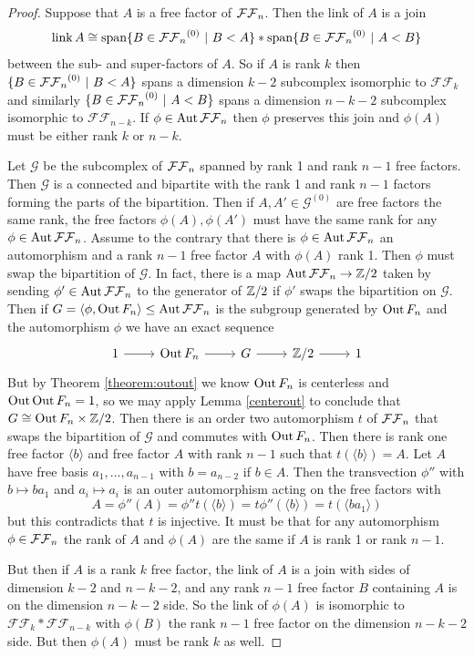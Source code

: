 \begin{proof}
  Suppose that $A$ is a free factor of ${ \mathcal {FF}_n }$.
  Then the link of $A$ is a join
  $$
  \operatorname{link} A \cong  \mbox{span} \{B \in {\ensuremath{ \mathcal {FF}_n }}^{(0)} \ | \ B < A\} \ast \mbox{span} \{B \in {\ensuremath{ \mathcal {FF}_n }}^{(0)}  \ | \ A<B\}
  $$
  between the sub- and  super-factors of $A$.
  So if $A$ is rank $k$ then
  $\{B \in {\ensuremath{ \mathcal {FF}_n }}^{(0)} \ | \ B < A\}$ spans a dimension $k-2$ subcomplex
  isomorphic to $\mathcal{FF}_k$ and similarly $\{B \in \ffn^{(0)}  \ | \ A<B\}$
  spans a dimension $n-k-2$ subcomplex
  isomorphic to $\mathcal{FF}_{n-k}$.
  If $\phi \in \operatorname{Aut} { \mathcal {FF}_n }$ then $\phi$ preserves this join and $\phi(A)$ must be either rank $k$ or $n-k$.

  Let $\mathcal G$ be the subcomplex of ${ \mathcal {FF}_n }$ spanned by rank 1 and rank $n-1$ free factors.
  Then $\mathcal G$ is a connected and bipartite with the rank 1 and rank $n-1$ factors forming the parts of the bipartition.
  Then if $A,A' \in \mathcal G^{(0)}$ are free factors the same rank, the free factors $\phi(A),\phi(A')$ must have the same rank for any $\phi \in \operatorname{Aut} { \mathcal {FF}_n }$.
  Assume to the contrary that there is $\phi \in \operatorname{Aut} { \mathcal {FF}_n }$ an automorphism
  and a rank $n-1$ free factor $A$ with $\phi(A)$ rank 1.
  Then $\phi$ must swap the bipartition of $\mathcal G$.
  In fact, there is a map $\operatorname{Aut} { \mathcal {FF}_n } \to \mathbb{Z}/2$ taken by sending $\phi' \in \operatorname{Aut} { \mathcal {FF}_n }$ to the generator of $\mathbb{Z}/2$
  if $\phi'$ swaps the bipartition on $\mathcal G$.
  Then if $G = \langle \phi, \operatorname{Out} F_n \rangle  \leq \operatorname{Aut} { \mathcal {FF}_n }$ is the subgroup generated by $\operatorname{Out} F_n$ and the automorphism $\phi$
  we have an exact sequence
  $$
  \begin{tikzcd}
    1 \arrow{r} &
    \oout F_n \arrow{r} &
    G  \arrow{r}&
    \Z/2  \arrow{r}&
    1
  \end{tikzcd}
  $$
  But by Theorem \ref{theorem:outout} we know $\operatorname{Out} F_n$ is centerless and $\operatorname{Out} \operatorname{Out} F_n = 1$,
  so we may apply Lemma
  \ref{centerout}
  to conclude that $G \cong \operatorname{Out} F_n  \times \mathbb{Z}/2$.
  Then there is an order two automorphism $t$ of ${ \mathcal {FF}_n }$ that swaps the bipartition of $\mathcal G$
  and commutes with $\operatorname{Out} F_n$.
  Then there is rank one free factor $\langle b \rangle$ and free factor $A$ with rank $n-1$
  such that $t(\langle b \rangle )=A$.
  Let $A$ have free basis $a_1,\ldots,a_{n-1}$ with $b=a_{n-2}$ if $b \in A$.
  Then the transvection $\phi''$ with $b \mapsto ba_1$ and $a_i \mapsto a_i$
  is an outer automorphism acting on the free factors with
  $$
  A = \phi''(A) =\phi'' t(\langle b \rangle ) = t \phi'' ( \langle b \rangle ) = t ( \langle ba_1 \rangle  )
  $$
  but this contradicts that $t$ is injective.
  It must be that for any automorphism $\phi \in {\ensuremath{ \mathcal {FF}_n }}$
  the rank of $A$ and $\phi(A)$ are the same if $A$ is rank 1 or rank $n-1$.

  But then if $A$ is a rank $k$ free factor, the link of $A$ is a join with sides of dimension $k-2$ and $n-k-2$,
  and any rank $n-1$ free factor $B$ containing $A$ is on the dimension  $n-k-2$ side.
  So the link of $\phi(A)$  is isomorphic to $\mathcal{FF}_k \ast \mathcal{FF}_{n-k}$
  with $\phi(B)$ the rank $n-1$ free factor on the dimension $n-k-2$ side.
  But then $\phi(A)$ must be rank $k$ as well.
\end{proof}


